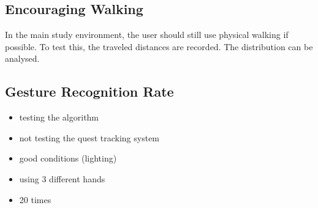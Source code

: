 \subsection{Encouraging Walking}
In the main study environment, the user should still use physical walking if possible. To test this, the traveled distances are recorded. The distribution can be analysed.







\subsection{Gesture Recognition Rate}
\begin{itemize}
    \item testing the algorithm
    \item not testing the quest tracking system
    \item good conditions (lighting)
    \item using 3 different hands
    \item 20 times
\end{itemize}



